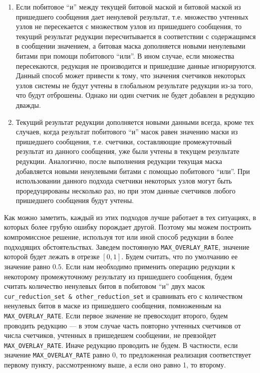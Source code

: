 \begin{enumerate}
    \item Если побитовое \enquote{и} между текущей битовой маской и битовой маской из пришедшего сообщения дает ненулевой результат, т.е. множество учтенных узлов не пересекается с множеством узлов из пришедшего сообщения, то текущий результат редукции пересчитывается в соответствии с содержащимся в сообщении значением, а битовая маска дополняется новыми ненулевыми битами при помощи побитового \enquote{или}. В ином случае, если множества пересекаются, редукция не производится и пришедшие данные игнорируются. Данный способ может привести к тому, что значения счетчиков некоторых узлов системы не будут учтены в глобальном результате редукции из-за того, что будут отброшены. Однако ни один счетчик не будет добавлен в редукцию дважды.
    
    \item Текущий результат редукции дополняется новыми данными всегда, кроме тех случаев, когда результат побитового \enquote{и} масок равен значению маски из пришедшего сообщения, т.е. счетчики, составляющие промежуточный результат из данного сообщения, уже были учтены в текущем результате редукции. Аналогично, после выполнения редукции текущая маска добавляется новыми ненулевыми битами с помощью побитового \enquote{или}. При использовании данного подхода счетчики некоторых узлов могут быть проредуцированы несколько раз, но при этом данные счетчиков любого пришедшего сообщения будут учтены.
\end{enumerate}

Как можно заметить, каждый из этих подходов лучше работает в тех ситуациях, в которых более грубую ошибку порождает другой. Поэтому мы можем построить компромиссное решение, используя тот или иной способ редукции в более подходящих обстоятельствах. Заведем постоянную \texttt{MAX\_OVERLAY\_RATE}, значение которой будет лежать в отрезке $[0, 1]$. Будем считать, что по умолчанию ее значение равно $0.5$. Если нам необходимо применить операцию редукции к некоторому промежуточному результату из пришедшего сообщения, будем считать количество ненулевых битов в побитовом \enquote{и} двух масок \texttt{cur\_reduction\_set \& other\_reduction\_set} и сравнивать его с количеством ненулевых битов в маске из пришедшего сообщения, помноженным на \texttt{MAX\_OVERLAY\_RATE}. Если первое значение не превосходит второго, будем проводить редукцию --- в этом случае часть повторно учтенных счетчиков от числа счетчиков, учтенных в пришедешем сообщении, не превзойдет \texttt{MAX\_OVERLAY\_RATE}. Иначе редукцию проводить не будем. В частности, если значение \texttt{MAX\_OVERLAY\_RATE} равно 0, то предложенная реализация соответствует первому пункту, рассмотренному выше, а если оно равно 1, то второму.

